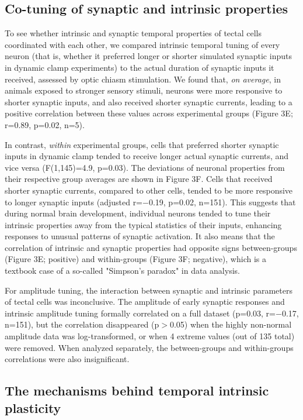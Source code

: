 \documentclass{article}
\begin{document}
\subsection*{Co-tuning of synaptic and intrinsic properties}

To see whether intrinsic and synaptic temporal properties of tectal cells coordinated with each other, we compared intrinsic temporal tuning of every neuron (that is, whether it preferred longer or shorter simulated synaptic inputs in dynamic clamp experiments) to the actual duration of synaptic inputs it received, assessed by optic chiasm stimulation. We found that, \textit{on average}, in animals exposed to stronger sensory stimuli, neurons were more responsive to shorter synaptic inputs, and also received shorter synaptic currents, leading to a positive correlation between these values across experimental groups (Figure 3E; r=0.89, p=0.02, n=5).

In contrast, \textit{within} experimental groups, cells that preferred shorter synaptic inputs in dynamic clamp tended to receive longer actual synaptic currents, and vice versa (F(1,145)=4.9, p=0.03). The deviations of neuronal properties from their respective group averages are shown in Figure 3F. Cells that received shorter synaptic currents, compared to other cells, tended to be more responsive to longer synaptic inputs (adjusted r=$-$0.19, p=0.02, n=151). This suggests that during normal brain development, individual neurons tended to tune their intrinsic properties away from the typical statistics of their inputs, enhancing responses to unusual patterns of synaptic activation. It also means that the correlation of intrinsic and synaptic properties had opposite signs between-groups (Figure 3E; positive) and within-groups (Figure 3F; negative), which is a textbook case of a so-called "Simpson's paradox" in data analysis.

For amplitude tuning, the interaction between synaptic and intrinsic parameters of tectal cells was inconclusive. The amplitude of early synaptic responses and intrinsic amplitude tuning formally correlated on a full dataset (p=0.03, r=$-$0.17, n=151), but the correlation disappeared (p$>$0.05) when the highly non-normal amplitude data was log-transformed, or when 4 extreme values (out of 135 total) were removed. When analyzed separately, the between-groups and within-groups correlations were also insignificant.

\subsection*{The mechanisms behind temporal intrinsic plasticity}
\end{document}

